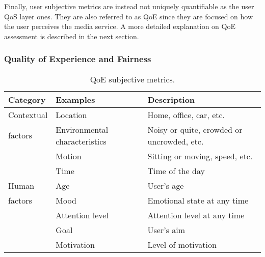 Finally, user subjective metrics are instead not uniquely quantifiable as the user QoS layer ones. They are also referred to as QoE since they are focused on how the user perceives the media service. A more detailed explanation on QoE assessment is described in the next section.

\subsubsection{Quality of Experience and Fairness}
\label{sec:IEEECOMSTqoe}

\begin{table}[htp]
	\caption{QoE subjective metrics.}
	\centering
	\label{tab:IEEECOMSTqoefactors}
	\def\arraystretch{1.2}%
	\setlength\tabcolsep{2.0pt} %
	{\scriptsize
		\begin{tabular}{>{\centering\arraybackslash}m{}
				>{\centering\arraybackslash}m{}
				>{\centering\arraybackslash}m{}
		}
		\toprule
		\textbf{Category} & \textbf{Examples} & \textbf{Description} \\
		\midrule
		\midrule
		Contextual & Location & Home, office, car, etc. \\
		\cline{2-3}
		factors & Environmental characteristics & Noisy or quite, crowded or uncrowded, etc. \\
		\cline{2-3}
		& Motion & Sitting or moving, speed, etc. \\
		\cline{2-3}
		& Time & Time of the day \\
		\hline
		Human & Age & User's age \\
		\cline{2-3}
		factors & Mood & Emotional state at any time \\
		\cline{2-3}
		& Attention level & Attention level at any time \\
		\cline{2-3}
		& Goal & User's aim \\
		\cline{2-3}
		& Motivation & Level of motivation \\
		\bottomrule
		\bottomrule
	\end{tabular}
	}
\end{table}

